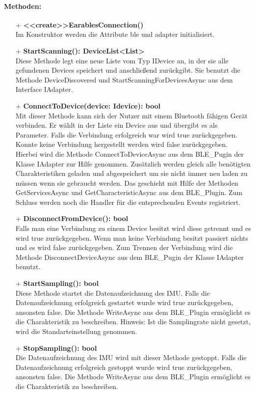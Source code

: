 \documentclass[a4paper,12pt]{article}
\begin{document}
\paragraph{Methoden:}
\begin{itemize}
	\item[+] \textbf{<<create>>\Gls{Earables}Connection()}\\ Im Konstruktor werden die Attribute ble und adapter initialisiert.
	\item[+] \textbf{StartScanning(): DeviceList<List>}\\ Diese Methode legt eine neue Liste vom Typ IDevice an, in der sie alle gefundenen Devices speichert und anschließend zurückgibt. Sie benutzt die Methode DeviceDiscovered und StartScanningForDevicesAsync aus dem Interface IAdapter.
	\item[+] \textbf{ConnectToDevice(device: Idevice): bool}\\ Mit dieser Methode kann sich der Nutzer mit einem Bluetooth fähigen Gerät verbinden. Er wählt in der Liste  ein Device aus und übergibt es als Parameter. Falls die Verbindung erfolgreich war wird true zurückgegeben. Konnte keine Verbindung hergestellt werden wird false zurückgegeben. Hierbei wird die Methode ConnectToDeviceAsync aus dem BLE\_Pugin der Klasse IAdapter zur Hilfe genommen. Zusätzlich werden gleich alle benötigten Charakteristiken geladen und abgespeichert um sie nicht immer neu laden zu müssen wenn sie gebraucht werden. Das geschieht mit Hilfe der Methoden GetServicesAsync und GetCharacteristicAsync aus dem BLE\_Plugin. Zum Schluss werden noch die Handler für die entsprechenden Events registriert.
	\item[+] \textbf{DisconnectFromDevice(): bool}\\ Falls man eine Verbindung zu einem Device besitzt wird diese getrennt und es wird true zurückgegeben. Wenn man keine Verbindung besitzt passiert nichts und es wird false zurückgegeben. Zum Trennen der Verbindung wird die Methode DisconnectDeviceAsync aus dem BLE\_Pugin der Klasse IAdapter benutzt.
	\item[+] \textbf{StartSampling(): bool}\\ Diese Methode startet die Datenaufzeichnung des IMU. Falls die Datenaufzeichnung erfolgreich gestartet wurde wird true zurückgegeben, ansonsten false. Die Methode WriteAsync aus dem BLE\_Plugin ermöglicht es die Charakteristik zu beschreiben. Hinweis: Ist die Samplingrate nicht gesetzt, wird die Standarteinstellung genommen.
	\item[+] \textbf{StopSampling(): bool}\\Die Datenaufzeichnung des IMU wird mit dieser Methode gestoppt. Falls die Datenaufzeichnung erfolgreich gestoppt wurde wird true zurückgegeben, ansonsten false. Die Methode WriteAsync aus dem BLE\_Plugin ermöglicht es die Charakteristik zu beschreiben.

\end{itemize}
\end{document}
